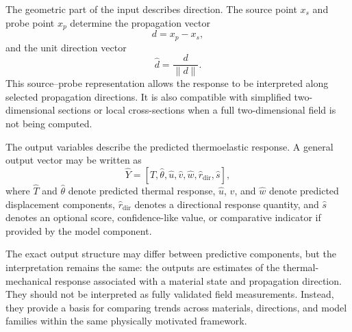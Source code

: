 The geometric part of the input describes direction. The source point \(x_s\) and probe point \(x_p\) determine the propagation vector
\begin{equation}
d
=
x_p-x_s,
\end{equation}
and the unit direction vector
\begin{equation}
\hat{d}
=
\frac{d}{\|d\|}.
\end{equation}
This source--probe representation allows the response to be interpreted along selected propagation directions. It is also compatible with simplified two-dimensional sections or local cross-sections when a full two-dimensional field is not being computed.

The output variables describe the predicted thermoelastic response. A general output vector may be written as
\begin{equation}
\widehat{Y}
=
\left[
\widehat{T},
\widehat{\theta},
\widehat{u},
\widehat{v},
\widehat{w},
\widehat{r}_{\mathrm{dir}},
\widehat{s}
\right],
\end{equation}
where \(\widehat{T}\) and \(\widehat{\theta}\) denote predicted thermal response, \(\widehat{u}\), \(\widehat{v}\), and \(\widehat{w}\) denote predicted displacement components, \(\widehat{r}_{\mathrm{dir}}\) denotes a directional response quantity, and \(\widehat{s}\) denotes an optional score, confidence-like value, or comparative indicator if provided by the model component.

The exact output structure may differ between predictive components, but the interpretation remains the same: the outputs are estimates of the thermal-mechanical response associated with a material state and propagation direction. They should not be interpreted as fully validated field measurements. Instead, they provide a basis for comparing trends across materials, directions, and model families within the same physically motivated framework.
